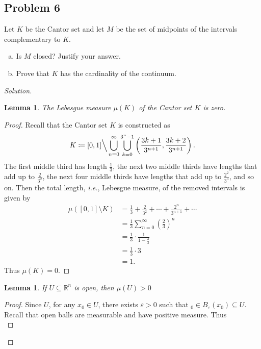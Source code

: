 \documentclass[12pt]{article}
\newcommand{\real}{\mathbb{R}}
\newcommand{\ita}[1]{\textit{#1}}
\newcommand\paren[1]{\left( #1 \right)}
\newcommand{\eps}{\varepsilon}
\newtheorem{lemma}[theorem]{Lemma}
\theoremstyle{definition}
\begin{document}
\subsection{Problem 6 \texorpdfstring{\cite{SS,Bartle}}{}}
Let $K$ be the Cantor set and let $M$ be the set of midpoints of the intervals complementary to $K$.
\begin{enumerate}[(a)]
    \item Is $M$ closed? Justify your answer.
    \item Prove that $K$ has the cardinality of the continuum.
\end{enumerate}
\begin{proof}[Solution]
    \begin{lemma}
        The Lebesgue measure $\mu(K)$ of the Cantor set $K$ is zero.
    \end{lemma}
    \begin{proof}
        Recall that the Cantor set $K$ is constructed as 
        \[
            K \coloneqq [0,1]  \Big\backslash \bigcup\limits_{n = 0}^{\infty} \bigcup\limits_{k = 0}^{3^n - 1} \paren{ \frac{3k+1}{3^{n+1}} , \frac{3k+2}{3^{n+1}} }.
        \]
        The first middle third has length $\frac{1}{3}$, the next two middle thirds have lengths that add up to $ \frac{2}{3^2}$, the next four middle thirds have lengths that add up to $\frac{2^2}{3^3}$, and so on. Then the total length, \ita{i.e.}, Lebesgue measure, of the removed intervals is given by 
        \begin{align*}
            \mu \paren{ [0,1] \setminus K } & = \frac{1}{3} + \frac{2}{3^2} + \dotsb + \frac{2^n}{3^{n+1}} + \dotsb \\
            & = \frac{1}{3} \sum\limits_{n = 0}^{\infty} \paren{ \frac{2}{3} }^n \\
            & = \frac{1}{3} \cdot \frac{1}{1 - \frac{2}{3}} \\
            & = \frac{1}{3} \cdot 3 \\
            & = \boxed{1.}
        \end{align*}
        Thus $\mu(K) = 0$.
    \end{proof}
    \begin{lemma}
        If $U \subseteq \real^n$ is open, then $\mu(U) > 0$
    \end{lemma}
    \begin{proof}
        Since $U$, for any $x_0 \in U$, there exists $\eps > 0$ such that $_0 \in B_{\eps}(x_0) \subseteq U$. Recall that open balls are measurable and have positive measure. Thus 
        \[
\]
\end{proof}
\end{proof}
\end{document}
